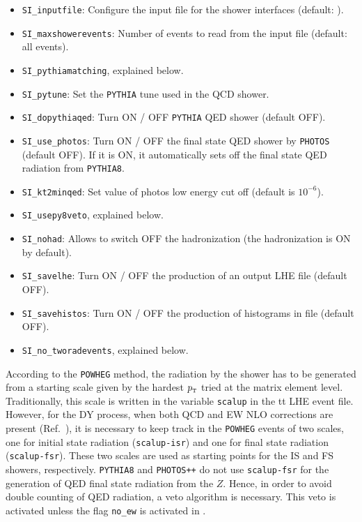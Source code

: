 \documentclass[paper]{JHEP3}
\newcommand{\tmtexttt}[1]{{\ttfamily{#1}}}
\newcommand\sss{\mathchoice%
{\displaystyle}%
{\scriptstyle}%
{\scriptscriptstyle}%
{\scriptscriptstyle}%
}
\newcommand\POWHEG{{\tt POWHEG}}
\newcommand\PYTHIAEIGHT{{\tt PYTHIA8}}
\newcommand\PYTHIA{{\tt PYTHIA}}
\newcommand\PHOTOS{{\tt PHOTOS}}
\newcommand\PHOTOSPP{{\tt PHOTOS++}}
\newcommand\pt{p_{\sss\rm T}}
\begin{document}
\begin{itemize}
\item[] \verb+SI_inputfile+: Configure the input file for the shower interfaces (default: \tmtexttt{./pwgevents.lhe}).
\item[]\verb+SI_maxshowerevents+: Number of events to read from the input file (default: all events).
\item[]\verb+SI_pythiamatching+, explained below.
\item[]\verb+SI_pytune+: Set the \PYTHIA{} tune used in the QCD shower.
\item[]\verb+SI_dopythiaqed+: Turn ON / OFF \PYTHIA{} QED shower (default OFF).
\item[]\verb+SI_use_photos+: Turn ON / OFF the final state QED shower by \PHOTOS{} (default OFF). If it is ON, it automatically sets off the final state QED radiation from \PYTHIAEIGHT{}.
\item[]\verb+SI_kt2minqed+: Set value of photos low energy cut off (default is $10^{-6}$).
\item[]\verb+SI_usepy8veto+, explained below.
\item[]\verb+SI_nohad+: Allows to switch OFF the hadronization (the hadronization is ON by default).
\item[]\verb+SI_savelhe+: Turn ON / OFF the production of an output LHE file (default OFF).
\item[]\verb+SI_savehistos+: Turn ON / OFF the production of histograms in \tmtexttt{.top} file (default OFF).
\item[]\verb+SI_no_tworadevents+, explained below.
\end{itemize}

According to the \POWHEG{} method, the radiation by the shower has to be generated from a starting scale given by the hardest $\pt$ tried at the matrix element level. Traditionally, this scale is written in the variable {\tt scalup} in the {tt LHE} event file. However, for the DY process, when both QCD and EW NLO corrections are present (Ref.~\cite{Barze:2013}), it is necessary to keep track in the \POWHEG{} events of two scales, one for initial state radiation ({\tt scalup-isr}) and one for final state radiation ({\tt scalup-fsr}). These two scales are used as starting points for the IS and FS showers, respectively. \PYTHIAEIGHT{} and \PHOTOSPP{} do not use {\tt scalup-fsr} for the generation of QED final state radiation from the $Z$. Hence, in order to avoid double counting of QED radiation, a veto algorithm is necessary. This veto is activated unless the flag \verb+no_ew+ is activated in \tmtexttt{powheg.input}.
\end{document}
